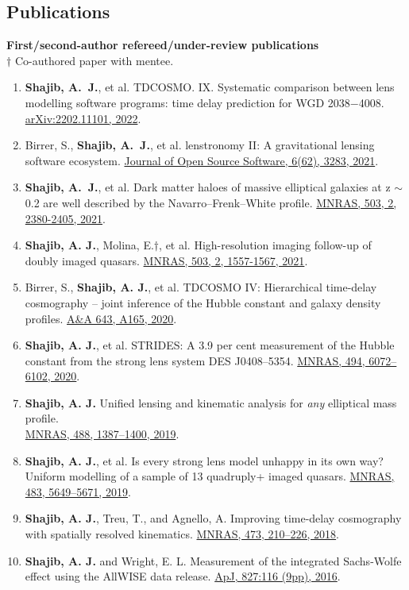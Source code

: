 \documentclass[margin, line]{res}
\begin{document}
\begin{resume}

\section{\sc Publications}
\textbf{First/second-author refereed/under-review publications}
\\ $\dagger$ Co-authored paper with mentee.
\begin{enumerate}
	\item \textbf{Shajib, A.~J.}, et al. TDCOSMO. IX. Systematic comparison between lens modelling software programs: time delay prediction for WGD 2038−4008. \href{https://arxiv.org/abs/2202.11101}{arXiv:2202.11101, 2022}.
	\item Birrer, S., \textbf{Shajib, A.~J.}, et al. lenstronomy II: A gravitational lensing software ecosystem. \href{https://joss.theoj.org/papers/10.21105/joss.03283}{Journal of Open Source Software, 6(62), 3283, 2021}.
	\item \textbf{Shajib, A.~J.}, et al. Dark matter haloes of massive elliptical galaxies at z $\sim$ 0.2 are well described by the Navarro--Frenk--White profile. \href{https://doi.org/10.1093/mnras/stab536}{MNRAS, 503, 2, 2380-2405, 2021}.
	\item \textbf{Shajib, A. J.}, Molina, E.{$\dagger$}, et al. High-resolution imaging follow-up of doubly imaged quasars. \href{https://doi:10.1093/mnras/stab532}{MNRAS, 503, 2, 1557-1567, 2021}.
	\item Birrer, S., \textbf{Shajib, A. J.}, et al. TDCOSMO IV: Hierarchical time-delay cosmography -- joint inference of the Hubble constant and galaxy density profiles. \href{https://doi.org/10.1051/0004-6361/202038861}{A\&A 643, A165, 2020}.
	\item \textbf{Shajib, A. J.}, et al. STRIDES: A 3.9 per cent measurement of the Hubble constant from the strong lens system DES J0408--5354. \href{https://academic.oup.com/mnras/advance-article-abstract/doi/10.1093/mnras/staa828/5813265}{MNRAS, 494, 6072--6102, 2020}.
	\item \textbf{Shajib, A. J.} Unified lensing and kinematic analysis for \textit{any} elliptical mass profile. \\ \href{https://doi.org/10.1093/mnras/stz1796}{MNRAS, 488, 1387--1400, 2019}.
	\item \textbf{Shajib, A. J.}, et al. Is every strong lens model unhappy in its own way? Uniform modelling of a sample of 13 quadruply+ imaged quasars. \href{https://doi.org/10.1093/mnras/sty3397}{MNRAS, 483, 5649--5671, 2019}.
	\item \textbf{Shajib, A. J.}, Treu, T., and Agnello, A. Improving time-delay cosmography with spatially resolved kinematics. \href{https://doi.org/10.1093/mnras/stx2302}{MNRAS, 473, 210--226, 2018}.
	\item \textbf{Shajib, A. J.} and Wright, E. L. Measurement of the integrated Sachs-Wolfe effect using the AllWISE data release. \href{http://dx.doi.org/10.3847/0004-637X/827/2/116}{ApJ, 827:116 (9pp), 2016}.
\end{enumerate}



\end{resume}
\end{document}
